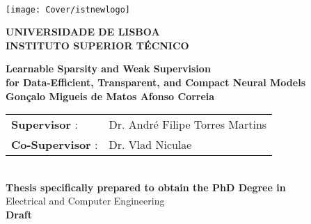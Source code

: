 \setcounter{page}{1} 


\thispagestyle{empty}
\begin{flushleft} ~\\ \vspace{-12mm} \hspace{-12mm}  \texttt{[image: Cover/istnewlogo]}

    \vspace{5mm}
    \centering
    \Large \textbf{UNIVERSIDADE DE LISBOA \\ INSTITUTO SUPERIOR TÉCNICO}
    \vspace{25mm}


    \centering
    \Large \textbf{Learnable Sparsity and Weak Supervision\\for Data-Efficient, Transparent, and Compact Neural Models}
    \\ \vspace{25mm}  %
    \large \textbf{Gonçalo Migueis de Matos Afonso Correia} \\
    \vspace{35mm}

    \begin{minipage}{\textwidth}
        \hspace{24mm}
        \begin{tabularx}{\textwidth}{ l @{ } l }
            \centering
            \textbf{Supervisor} :    & Dr. André Filipe Torres Martins \\
            \textbf{Co-Supervisor} : & Dr. Vlad Niculae                \\
        \end{tabularx}
    \end{minipage}
    \\ \vspace{20mm}
    \centering
    \large \textbf{Thesis specifically prepared to obtain the PhD Degree in}\\
    \large Electrical and Computer Engineering\\
    \vspace{18mm}
    \Large \textbf{Draft}


\end{flushleft}
